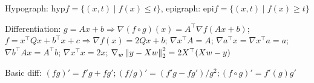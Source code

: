 Hypograph: $\text{hyp} f = \{ (x,t) \mid f(x) \leq t \}$, epigraph: $\text{epi} f = \{ (x,t) \mid f(x) \geq t \}$

Differentiation: $g = Ax+b \Rightarrow \nabla(f \circ g)(x) = A^\top \nabla f(Ax+b)$; $ f = x^\top Q x + b^\top x + c \Rightarrow \nabla f(x) = 2Qx + b$; $ \nabla x^\top A = A$; $ \nabla a^\top x = \nabla x^\top a = a$; $ \nabla b^\top A x = A^\top b$; $ \nabla x^\top x = 2x$; $ \nabla_w \left\lVert y - Xw \right\rVert_2^2 = 2X^\top (Xw-y)$

Basic diff: $(fg)' = f'g + fg'; (f/g)' = (f'g - fg')/g^2; (f \circ g)' = f'(g)g'$



